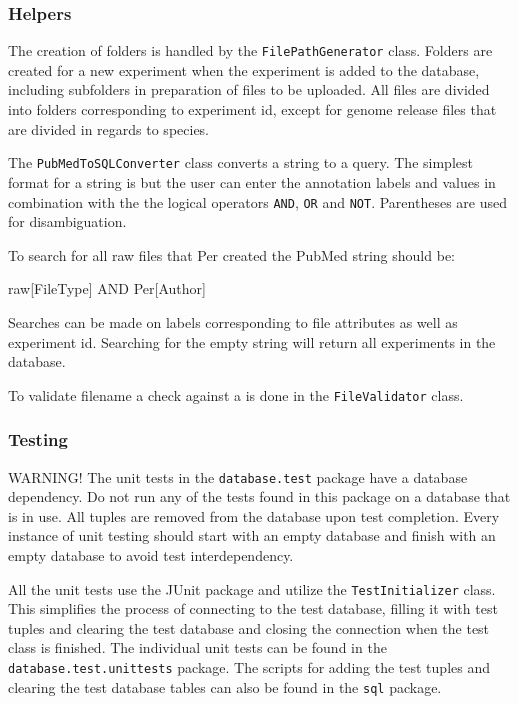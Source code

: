 \subsubsection{Helpers}
The creation of folders is handled by the \texttt{FilePathGenerator} class. Folders are created for a new experiment when the experiment is added to the database, including subfolders in preparation of files to be uploaded. All files are divided into folders corresponding to experiment id, except for genome release files that are divided in regards to species.

The \texttt{PubMedToSQLConverter} class converts a  string to a  query. The simplest format for a  string is  but the user can enter the annotation labels and values in combination with the the logical operators \texttt{AND}, \texttt{OR} and \texttt{NOT}. Parentheses are used for disambiguation.
\begin{example}
To search for all raw files that Per created the PubMed string should be:

raw[FileType] AND Per[Author]
\end{example}

Searches can be made on labels corresponding to file attributes as well as experiment id. Searching for the empty string will return all experiments in the database.

To validate filename a check against a  is done in the \texttt{FileValidator} class.

\subsubsection{Testing}
WARNING! The unit tests in the \texttt{database.test} package have a database dependency. Do not run any of the tests found in this package on a database that is in use. All tuples are removed from the database upon test completion. Every instance of unit testing should start with an empty database and finish with an empty database to avoid test interdependency.

All the unit tests use the JUnit package and utilize the \texttt{TestInitializer} class. This simplifies the process of connecting to the test database, filling it with test tuples and clearing the test database and closing the connection when the test class is finished. The individual unit tests can be found in the \texttt{database.test.unittests} package. The scripts for adding the test tuples and clearing the test database tables can also be found in the \texttt{sql} package.